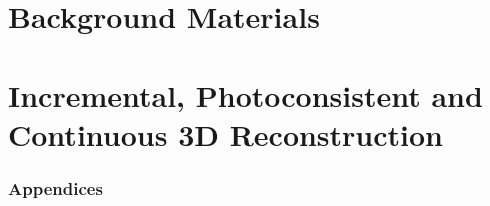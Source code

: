 \documentclass[10pt,twoside,openright,english]{book}%
\begin{document}

\maketitle

\pagestyle{empty}

\cleardoublepage
\newpage

%

\cleardoublepage
\newpage

\pagestyle{fancy}
\setcounter{page}{1}





\dominitoc%
\tableofcontents
\cleardoublepage
\newpage

\setcounter{page}{1}

\cleardoublepage

\part{Background Materials}



\part{Incremental, Photoconsistent and Continuous 3D Reconstruction}







\cleardoublepage

\appendix
{}
\section*{Appendices}





\cleardoublepage
{}
{}
\small


\end{document}
